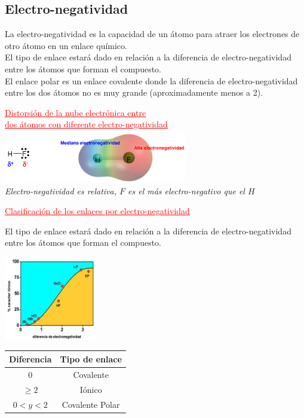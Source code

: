     \subsection{Electro-negatividad}
        \sangria{} La electro-negatividad es la capacidad de un átomo para atraer los electrones de otro átomo en un enlace químico. \\
        \sangria{} El tipo de enlace estará dado en relación a la diferencia de electro-negatividad entre los átomos que forman el compuesto. \\
        \sangria{} El enlace polar es un enlace covalente donde la diferencia de electro-negatividad entre los dos átomos no es muy grande (aproximadamente menos a 2).
        \begin{center} \textcolor{red}{\underline{Distorsión de la nube electrónica entre} \\ \underline{dos átomos con diferente electro-negatividad}} \\[10pt] \includegraphics[width=8cm]{./imagenes/distorsionNubeElectronicaEntreAtomosDiferenteElectroNeg.png} \\[10pt] \textit{Electro-negatividad es relativa, $F$ es el más electro-negativo que el $H$} \end{center}
        \begin{center} \textcolor{red}{\underline{Clasificación de los enlaces por electro-negatividad}} \end{center}
        \sangria{} El tipo de enlace estará dado en relación a la diferencia de electro-negatividad entre los átomos que forman el compuesto.
        \begin{center} \includegraphics[width=4cm]{./imagenes/clasificacionEnlacesElectronegatividad.png} \end{center}
        \begin{center}
            \begin{tabular}{| c | c |}
                \toprule
                \textbf{Diferencia} & \textbf{Tipo de enlace} \\
                \midrule
                0 & Covalente \\
                \midrule
                $\geq 2$ & Iónico \\
                \midrule
                $0 < y < 2$ & Covalente Polar \\
                \bottomrule
            \end{tabular}
        \end{center}
